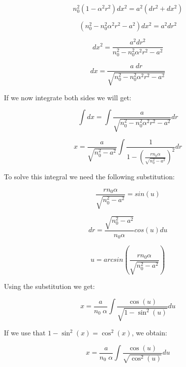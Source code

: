\documentclass{article}
\begin{document}
\begin{equation}
	n_0^2 (1 - \alpha ^2 r^2)  dx^2 = a^2 (dr^2 + dx^2)
\end{equation}

\begin{equation}
	(n_0 ^2 - n_0^2 \alpha ^2 r^2 - a^2)  dx^2 = a^2 dr^2
\end{equation}

\begin{equation}
	dx^2 =\frac{a^2 dr^2}{n_0 ^2 - n_0^2 \alpha ^2 r^2 - a^2}
\end{equation}

\begin{equation}
	dx =\frac{a \; dr}{\sqrt{n_0 ^2 - n_0^2 \alpha ^2 r^2 - a^2}}
\end{equation}

If we now integrate both sides we will get:

\begin{equation}
	\int dx = \int \frac{a}{\sqrt{n_0 ^2 - n_0^2 \alpha ^2 r^2 - a^2}} dr
\end{equation}

\begin{equation}
	x = \frac{a}{\sqrt{n_0^2 - a^2}} \int \frac{1}{1 - \left( \frac{r n_0 \alpha}{\sqrt{n_0^2-a^2}} \right) ^2} dr
\end{equation}

To solve this integral we need the following substitution:

\begin{equation}
	 \frac{r n_0 \alpha}{\sqrt{n_0^2-a^2}} = sin(u)
\end{equation}

\begin{equation}
	 dr = \frac{\sqrt{n_0^2-a^2}}{n_0 \alpha} cos(u) du
\end{equation} 

\begin{equation}
	 u = arcsin \left( \frac{r n_0 \alpha}{\sqrt{n_0^2-a^2}} \right)
\end{equation}

Using the substitution we get:

\begin{equation}
	x = \frac{a}{n_0 \; \alpha} \int \frac{\cos (u)}{\sqrt{1 - \sin^2 (u)}} du
\end{equation}

If we use that $1 - \sin^2 (x) = \cos^2 (x)$, we obtain:

\begin{equation}
	x = \frac{a}{n_0 \; \alpha} \int \frac{\cos (u)}{\sqrt{\cos^2 (u)}} du
\end{equation}
\end{document}
